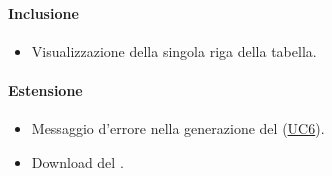\paragraph*{Inclusione}
\begin{itemize}
  \item Visualizzazione della singola riga della tabella. %
\end{itemize}

\paragraph*{Estensione}
\begin{itemize}
  \item Messaggio d'errore nella generazione del  (\hyperref[UC6]{UC6}).
  \item Download del . %
\end{itemize}
